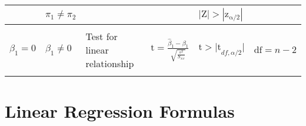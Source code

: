 \documentclass[8pt]{extarticle}
\begin{document}
\begin{center}
\begin{tabular}{ | l | l | l | l | l | l | }
        & $\pi_1\ne\pi_2$
        &
        & 
        & $\mathrm{|Z|}>\mathrm{|z_{\alpha/2}|}$ 
        & \\ \hline\hline

        &
        &
        &
        &
        & \\

        $\beta_1=0$
        & $\beta_1\ne0$
        & Test for linear relationship
        & $\mathrm{t}=\frac{\hat{\beta}_1-\beta_1}{\sqrt{\frac{s^2}{S_{xx}}}}$
        & $\mathrm{t}>\mathrm{|t}_{df,\alpha/2}|$ 
        & $\mathrm{df}={n-2}$ \\ 

        &
        &
        &
        &
        & \\ \hline

    \end{tabular}
\end{center}

\section{Linear Regression Formulas}
\end{document}
